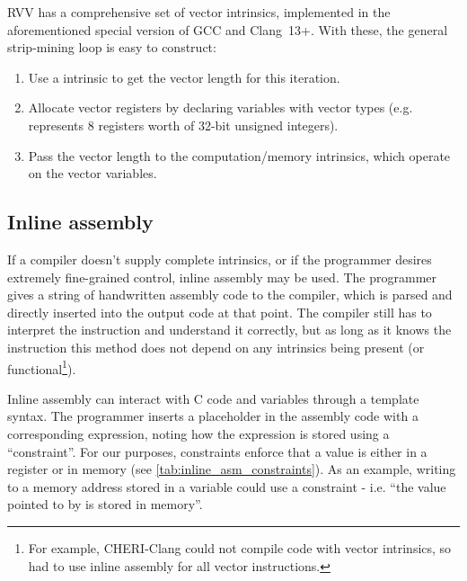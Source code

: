 RVV has a comprehensive set of vector intrinsics\cite{specification-RVV-intrinsics}, implemented in the aforementioned special version of GCC and Clang~13+.
With these, the general strip-mining loop is easy to construct:
\begin{enumerate}
    \item Use a  intrinsic to get the vector length for this iteration.
    \item Allocate vector registers by declaring variables with vector types (e.g.  represents 8 registers worth of 32-bit unsigned integers).
    \item Pass the vector length to the computation/memory intrinsics, which operate on the vector variables.
\end{enumerate}


\subsection{Inline assembly}
If a compiler doesn't supply complete intrinsics, or if the programmer desires extremely fine-grained control, inline assembly may be used.
The programmer gives a string of handwritten assembly code to the compiler, which is parsed and directly inserted into the output code at that point.
The compiler still has to interpret the instruction and understand it correctly, but as long as it knows the instruction this method does not depend on any intrinsics being present (or functional\footnote{For example, CHERI-Clang could not compile code with vector intrinsics, so had to use inline assembly for all vector instructions.}).

Inline assembly can interact with C code and variables through a template syntax.
The programmer inserts a placeholder in the assembly code with a corresponding expression, noting how the expression is stored using a \enquote{constraint}.
For our purposes, constraints enforce that a value is either in a register or in memory (see \cref{tab:inline_asm_constraints}).
As an example, writing to a memory address stored in a variable could use a constraint  - i.e. \enquote{the value pointed to by  is stored in memory}.  

